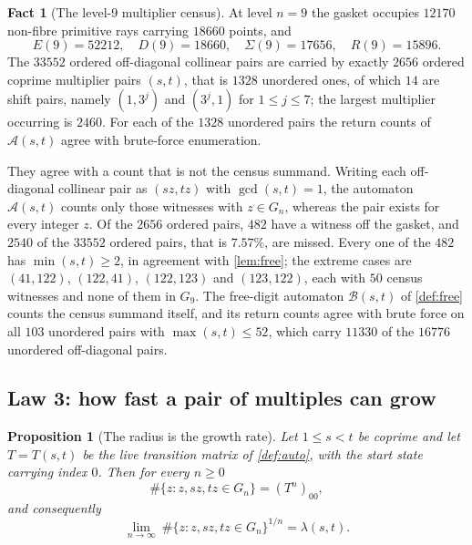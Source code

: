 \documentclass[11pt]{amsart}
\newtheorem{proposition}[theorem]{Proposition}
\theoremstyle{definition}
\newtheorem{fact}[theorem]{Fact}
\theoremstyle{remark}
\begin{document}
\begin{fact}[The level-9 multiplier census]
\label{fact:pairs9}
At level $n=9$ the gasket occupies $12170$ non-fibre primitive rays carrying $18660$ points, and
\[
E(9)=52212,\quad D(9)=18660,\quad \Sigma(9)=17656,\quad R(9)=15896 .
\]
The $33552$ ordered off-diagonal collinear pairs are carried by exactly $2656$ ordered coprime multiplier pairs $(s,t)$, that is $1328$ unordered ones, of which $14$ are shift pairs, namely $(1,3^j)$ and $(3^j,1)$ for $1\le j\le 7$; the largest multiplier occurring is $2460$. For each of the $1328$ unordered pairs the return counts of $\mathcal{A}(s,t)$ agree with brute-force enumeration.

They agree with a count that is not the census summand. Writing each off-diagonal collinear pair as $(sz,tz)$ with $\gcd(s,t)=1$, the automaton $\mathcal{A}(s,t)$ counts only those witnesses with $z\in G_n$, whereas the pair exists for every integer $z$. Of the $2656$ ordered pairs, $482$ have a witness off the gasket, and $2540$ of the $33552$ ordered pairs, that is $7.57\%$, are missed. Every one of the $482$ has $\min(s,t)\ge 2$, in agreement with \cref{lem:free}; the extreme cases are $(41,122)$, $(122,41)$, $(122,123)$ and $(123,122)$, each with $50$ census witnesses and none of them in $G_9$. The free-digit automaton $\mathcal{B}(s,t)$ of \cref{def:free} counts the census summand itself, and its return counts agree with brute force on all $103$ unordered pairs with $\max(s,t)\le 52$, which carry $11330$ of the $16776$ unordered off-diagonal pairs.
\end{fact}

\subsection{Law 3: how fast a pair of multiples can grow}

\begin{proposition}[The radius is the growth rate]
\label{prop:growth}
Let $1\le s<t$ be coprime and let $T=T(s,t)$ be the live transition matrix of \cref{def:auto}, with the start state carrying index $0$. Then for every $n\ge 0$
\[
\#\{z : z, sz, tz\in G_n\}=(T^n)_{00} ,
\]
and consequently
\[
\lim_{n\to\infty}\ \#\{z : z, sz, tz\in G_n\}^{1/n}=\lambda(s,t).
\]
\end{proposition}
\end{document}
